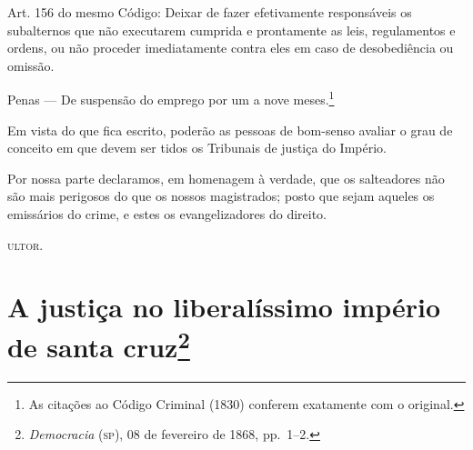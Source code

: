 Art. 156 do mesmo Código: Deixar de fazer efetivamente responsáveis os
subalternos que não executarem cumprida e prontamente as leis,
regulamentos e ordens, ou não proceder imediatamente contra eles em caso
de desobediência ou omissão.

Penas --- De suspensão do emprego por um a nove meses.\footnote{As
  citações ao Código Criminal (1830) conferem exatamente com o original.}

Em vista do que fica escrito, poderão as pessoas de bom-senso avaliar o
grau de conceito em que devem ser tidos os Tribunais de justiça do
Império.

Por nossa parte declaramos, em homenagem à verdade, que os salteadores
não são mais perigosos do que os nossos magistrados; posto que sejam
aqueles os emissários do crime, e estes os evangelizadores do direito.

\textsc{ultor}.

\chapter{A justiça no liberalíssimo império de santa cruz\footnote{\emph{Democracia} (\textsc{sp}), 08 de fevereiro de 1868, pp.~1--2.}}


